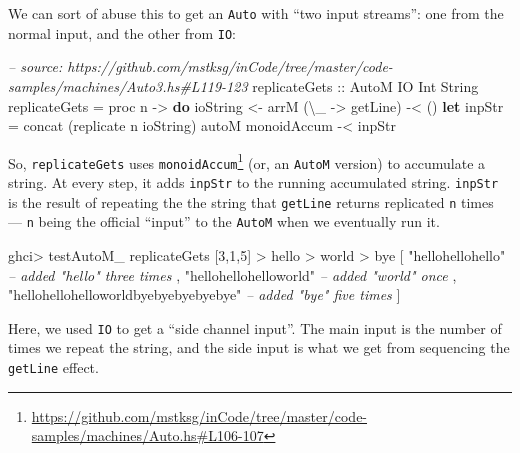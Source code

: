 \documentclass[]{article}
\newenvironment{Shaded}{}{}
\newcommand{\KeywordTok}[1]{\textcolor[rgb]{0.00,0.44,0.13}{\textbf{{#1}}}}
\newcommand{\DataTypeTok}[1]{\textcolor[rgb]{0.56,0.13,0.00}{{#1}}}
\newcommand{\DecValTok}[1]{\textcolor[rgb]{0.25,0.63,0.44}{{#1}}}
\newcommand{\StringTok}[1]{\textcolor[rgb]{0.25,0.44,0.63}{{#1}}}
\newcommand{\CommentTok}[1]{\textcolor[rgb]{0.38,0.63,0.69}{\textit{{#1}}}}
\newcommand{\OtherTok}[1]{\textcolor[rgb]{0.00,0.44,0.13}{{#1}}}
\newcommand{\FunctionTok}[1]{\textcolor[rgb]{0.02,0.16,0.49}{{#1}}}
\newcommand{\NormalTok}[1]{{#1}}
\renewcommand{\href}[2]{#2\footnote{\url{#1}}}
\begin{document}
We can sort of abuse this to get an \texttt{Auto} with ``two input
streams'': one from the normal input, and the other from \texttt{IO}:

\begin{Shaded}
\begin{Highlighting}[]
\CommentTok{-- source: https://github.com/mstksg/inCode/tree/master/code-samples/machines/Auto3.hs#L119-123}
\OtherTok{replicateGets ::} \DataTypeTok{AutoM} \DataTypeTok{IO} \DataTypeTok{Int} \DataTypeTok{String}
\NormalTok{replicateGets }\FunctionTok{=} \NormalTok{proc n }\OtherTok{->} \KeywordTok{do}
    \NormalTok{ioString }\OtherTok{<-} \NormalTok{arrM (\textbackslash{}_ }\OtherTok{->} \NormalTok{getLine) }\FunctionTok{-<} \NormalTok{()}
    \KeywordTok{let} \NormalTok{inpStr }\FunctionTok{=} \NormalTok{concat (replicate n ioString)}
    \NormalTok{autoM monoidAccum }\FunctionTok{-<} \NormalTok{inpStr}
\end{Highlighting}
\end{Shaded}

So, \texttt{replicateGets} uses
\href{https://github.com/mstksg/inCode/tree/master/code-samples/machines/Auto.hs\#L106-107}{\texttt{monoidAccum}}
(or, an \texttt{AutoM} version) to accumulate a string. At every step,
it adds \texttt{inpStr} to the running accumulated string.
\texttt{inpStr} is the result of repeating the the string that
\texttt{getLine} returns replicated \texttt{n} times --- \texttt{n}
being the official ``input'' to the \texttt{AutoM} when we eventually
run it.

\begin{Shaded}
\begin{Highlighting}[]
\NormalTok{ghci}\FunctionTok{>} \NormalTok{testAutoM_ replicateGets [}\DecValTok{3}\NormalTok{,}\DecValTok{1}\NormalTok{,}\DecValTok{5}\NormalTok{]}
\FunctionTok{>} \NormalTok{hello}
\FunctionTok{>} \NormalTok{world}
\FunctionTok{>} \NormalTok{bye}
\NormalTok{[ }\StringTok{"hellohellohello"}         \CommentTok{-- added "hello" three times}
\NormalTok{, }\StringTok{"hellohellohelloworld"}    \CommentTok{-- added "world" once}
\NormalTok{, }\StringTok{"hellohellohelloworldbyebyebyebyebye"}     \CommentTok{-- added "bye" five times}
\NormalTok{]}
\end{Highlighting}
\end{Shaded}

Here, we used \texttt{IO} to get a ``side channel input''. The main
input is the number of times we repeat the string, and the side input is
what we get from sequencing the \texttt{getLine} effect.
\end{document}
